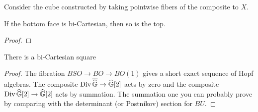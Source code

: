 \begin{lemma}
Consider the cube constructed by taking pointwise fibers of the composite to $X$.
\begin{center}
\end{center}
If the bottom face is bi-Cartesian, then so is the top.
\end{lemma}
\begin{proof}
\end{proof}

\begin{corollary}
There is a bi-Cartesian square
\begin{center}
\end{center}
\end{corollary}
\begin{proof}
The fibration $BSO \to BO \to BO(1)$ gives a short exact sequence of Hopf algebras.  The composite $\operatorname{Div} \overline{\widehat{\mathbb G}} \to \widehat{\mathbb G}[2]$ acts by zero and the composite $\operatorname{Div} \widehat{\mathbb G}[2] \to \widehat{\mathbb G}[2]$ acts by summation.  The summation one you can probably prove by comparing with the determinant (or Postnikov) section for $BU$.
\end{proof}

